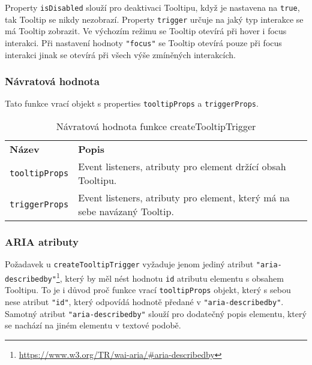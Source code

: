 Property \texttt{isDisabled} slouží pro deaktivaci Tooltipu, když je nastavena na \texttt{true}, tak Tooltip se nikdy nezobrazí.
Property \texttt{trigger} určuje na jaký typ interakce se má Tooltip zobrazit.
Ve výchozím režimu se Tooltip otevírá při hover i focus interakci.
Při nastavení hodnoty \texttt{"focus"} se Tooltip otevírá pouze při focus interakci jinak se otevírá při všech výše zmíněných interakcích.

\subsubsection{Návratová hodnota}

Tato funkce vrací objekt s properties \texttt{tooltipProps} a \texttt{triggerProps}.

\begin{table}[ht]
    \begin{ctucolortab}
        \begin{tabularx}{\textwidth}{p{3cm} X}
            \bfseries Název       & \bfseries Popis                                                           \\\Midrule{}
            \texttt{tooltipProps} & Event listeners, atributy pro element držící obsah Tooltipu.              \\
            \texttt{triggerProps} & Event listeners, atributy pro element, který má na sebe navázaný Tooltip. \\
        \end{tabularx}
    \end{ctucolortab}
    \caption{Návratová hodnota funkce createTooltipTrigger}
    \label{table:tooltip-trigger-return}
\end{table}

\subsubsection{ARIA atributy}

Požadavek \hyperref[ofr12]{} u \texttt{createTooltipTrigger} vyžaduje jenom jediný atribut \texttt{"aria-describedby"}\footnote{\url{https://www.w3.org/TR/wai-aria/\#aria-describedby}}, který by měl nést hodnotu \texttt{id} atributu elementu s obsahem Tooltipu.
To je i důvod proč funkce vrací \texttt{tooltipProps} objekt, který s sebou nese atribut \texttt{"id"}, který odpovídá hodnotě předané v \texttt{"aria-describedby"}.
Samotný atribut \texttt{"aria-describedby"} slouží pro dodatečný popis elementu, který se nachází na jiném elementu v textové podobě.

